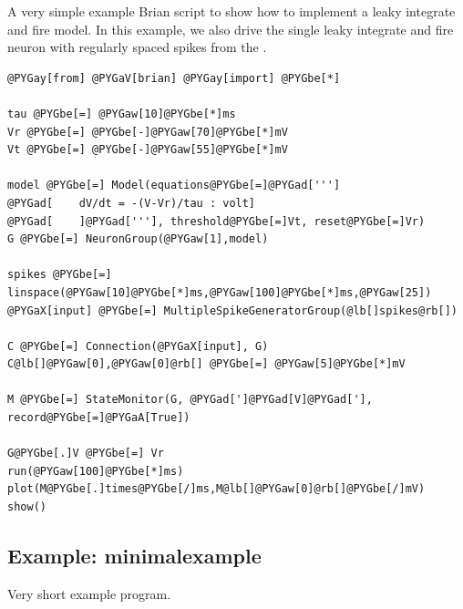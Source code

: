 \documentclass[letterpaper,10pt]{manual}
\begin{document}
A very simple example Brian script to show how to implement
a leaky integrate and fire model. In this example, we also
drive the single leaky integrate and fire neuron with
regularly spaced spikes from the \hyperlink{brian.SpikeGeneratorGroup}{}.

\begin{Verbatim}[commandchars=@\[\]]
@PYGay[from] @PYGaV[brian] @PYGay[import] @PYGbe[*]

tau @PYGbe[=] @PYGaw[10]@PYGbe[*]ms
Vr @PYGbe[=] @PYGbe[-]@PYGaw[70]@PYGbe[*]mV
Vt @PYGbe[=] @PYGbe[-]@PYGaw[55]@PYGbe[*]mV

model @PYGbe[=] Model(equations@PYGbe[=]@PYGad[''']
@PYGad[    dV/dt = -(V-Vr)/tau : volt]
@PYGad[    ]@PYGad['''], threshold@PYGbe[=]Vt, reset@PYGbe[=]Vr)
G @PYGbe[=] NeuronGroup(@PYGaw[1],model)

spikes @PYGbe[=] linspace(@PYGaw[10]@PYGbe[*]ms,@PYGaw[100]@PYGbe[*]ms,@PYGaw[25])
@PYGaX[input] @PYGbe[=] MultipleSpikeGeneratorGroup(@lb[]spikes@rb[])

C @PYGbe[=] Connection(@PYGaX[input], G)
C@lb[]@PYGaw[0],@PYGaw[0]@rb[] @PYGbe[=] @PYGaw[5]@PYGbe[*]mV

M @PYGbe[=] StateMonitor(G, @PYGad[']@PYGad[V]@PYGad['], record@PYGbe[=]@PYGaA[True])

G@PYGbe[.]V @PYGbe[=] Vr
run(@PYGaw[100]@PYGbe[*]ms)
plot(M@PYGbe[.]times@PYGbe[/]ms,M@lb[]@PYGaw[0]@rb[]@PYGbe[/]mV)
show()
\end{Verbatim}

\resetcurrentobjects
{}

\hypertarget{index-37}{}\subsection{Example: minimalexample}

Very short example program.
\end{document}
